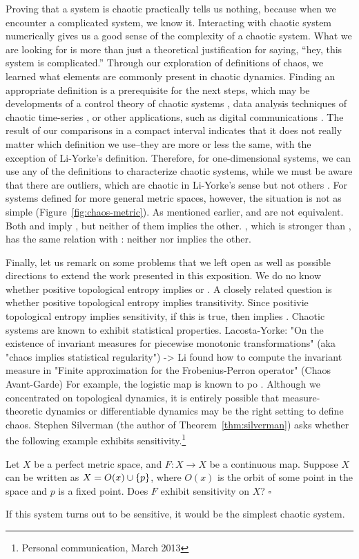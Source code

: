\documentclass[10pt,twoside,draft]{book}
\begin{document}
Proving that a system is chaotic practically tells us nothing, because when we encounter a complicated system, we know it.
Interacting with chaotic system numerically gives us a good sense of the complexity of a chaotic system.
What we are looking for is more than just a theoretical justification for saying, ``hey, this system is complicated.''
Through our exploration of definitions of chaos, we learned what elements are commonly present in chaotic dynamics.
Finding an appropriate definition is a prerequisite for the next steps, which may be developments of a control theory of chaotic systems \citep{openproblems, chaos-frontiers}, data analysis techniques of chaotic time-series \citep{kantz-schreiber, sprott, abarbanel}, or other applications, such as digital communications \citep{chaos-communication}.
The result of our comparisons in a compact interval indicates that it does not really matter which definition we use--they are more or less the same, with the exception of Li-Yorke's definition.
Therefore, for one-dimensional systems, we can use any of the definitions to characterize chaotic systems, while we must be aware that there are outliers, which are chaotic in Li-Yorke's sense but not others \citep{smital, misiurewicz1}.
For systems defined for more general metric spaces, however, the situation is not as simple (Figure~\ref{fig:chaos-metric}).
As mentioned earlier, \wig and \liy are not equivalent.
Both \dev and \akm imply \liy, but neither of them implies the other.
\blcp, which is stronger than \akm, has the same relation with \dev: neither \blcp nor \akm implies the other.


Finally, let us remark on some problems that we left open as well as possible directions to extend the work presented in this exposition.
We do no know whether positive topological entropy implies \wig or \blcp.
A closely related question is whether positive topological entropy implies transitivity. 
Since positivie topological entropy implies sensitivity, if this is true, then \akm implies \wig.
Chaotic systems are known to exhibit statistical properties.
Lacosta-Yorke: "On the existence of invariant measures for piecewise monotonic transformations"
(aka "chaos implies statistical regularity")
-> Li found how to compute the invariant measure in "Finite approximation for the Frobenius-Perron operator"
(Chaos Avant-Garde)
For example, the logistic map is known to po \citep{sternberg}.
Although we concentrated on topological dynamics, it is entirely possible that measure-theoretic dynamics or differentiable dynamics may be the right setting to define chaos.
Stephen Silverman (the author of Theorem~\ref{thm:silverman}) asks whether the following example exhibits sensitivity.\footnote{Personal communication, March 2013}
\begin{example}
  Let $X$ be a perfect metric space, and $F: X \to X$ be a continuous map.
  Suppose $X$ can be written as $X = O(x) \cup \left \{ p \right \}$, where $O(x)$ is the orbit of some point in the space and $p$ is a fixed point.
  Does $F$ exhibit sensitivity on $X$?
  $\square$
\end{example}
If this system turns out to be sensitive, it would be the simplest chaotic system.



\end{document}
